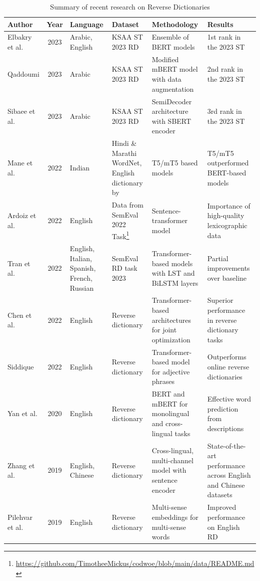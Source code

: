 \documentclass[12pt]{article}
\begin{document}
\begin{table}
    \centering
    \caption{Summary of recent research on Reverse Dictionaries}
    \small
    \renewcommand{\arraystretch}{1.75}
    \begin{tabularx}{\textwidth}{|l|c|L{0.7}|L{1.1}|L{1}|L{1.2}|}
        \hline
        \textbf{Author} & \textbf{Year} &  \textbf{Language} & \textbf{Dataset} & \textbf{Methodology} & \textbf{Results} \\
        \hline
        Elbakry et al. \cite{Albakry2023} & 2023 & Arabic, English & KSAA ST 2023 RD & Ensemble of BERT models & 1st rank in the 2023 ST \\
        \hline
        Qaddoumi \cite{Qaddoumi2023} & 2023 & Arabic & KSAA ST 2023 RD & Modified mBERT model with data augmentation & 2nd rank in the 2023 ST \\
        \hline
        Sibaee et al. \cite{Sibaee2023} & 2023 & Arabic & KSAA ST 2023 RD & SemiDecoder architecture with SBERT encoder & 3rd rank in the 2023 ST \\
        \hline
        Mane et al. \cite{Mane2022} & 2022 & Indian & Hindi \& Marathi WordNet, English dictionary by \cite{Hill2016} & T5/mT5 based models & T5/mT5 outperformed BERT-based models \\
        \hline
        Ardoiz et al. \cite{Ardoiz2022} & 2022 & English & Data from SemEval 2022 Task\footnote{\href{https://github.com/TimotheeMickus/codwoe/blob/main/data/README.md}{https://github.com/TimotheeMickus/codwoe/blob/main/data/README.md}} & Sentence-transformer model & Importance of high-quality lexicographic data \\
        \hline
        Tran et al.\cite{Tran2022} & 2022 & English, Italian, Spanish, French, Russian & SemEval RD task 2023 & Transformer-based models with LST and BiLSTM layers & Partial improvements over baseline \\
        \hline
        Chen et al. \cite{Chen2022} & 2022 & English & Reverse dictionary & Transformer-based architectures for joint optimization & Superior performance in reverse dictionary tasks \\
        \hline
        Siddique \cite{Siddique2022} & 2022 & English & Reverse dictionary & Transformer-based model for adjective phrases & Outperforms online reverse dictionaries \\
        \hline
        Yan et al. \cite{Yan2020} & 2020 & English & Reverse dictionary & BERT and mBERT for monolingual and cross-lingual tasks & Effective word prediction from descriptions \\
        \hline
        Zhang et al. \cite{Zhang2019} & 2019 & English, Chinese & Reverse dictionary & Cross-lingual, multi-channel model with sentence encoder & State-of-the-art performance across English and Chinese datasets \\
        \hline
        Pilehvar et al. \cite{Pilehvar2019} & 2019 & English & Reverse dictionary & Multi-sense embeddings for multi-sense words & Improved performance on English RD \\
        \hline
    \end{tabularx}
\end{table}
\end{document}
